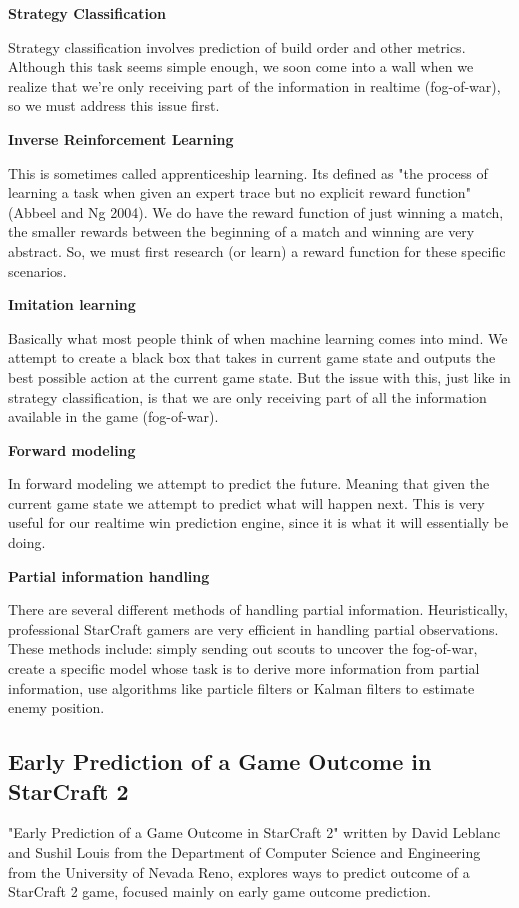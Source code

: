 \documentclass[a4paper,12pt]{report}
\newcommand{\msection}[1]{\noindent\textbf{#1}}
\begin{document}
\msection{Strategy Classification}

Strategy classification involves prediction of build order and other metrics. Although this task seems simple enough, we soon come into a wall when we realize that we're only receiving part of the information in realtime (fog-of-war), so we must address this issue first.

\msection{Inverse Reinforcement Learning}

This is sometimes called apprenticeship learning. Its defined as "the process of learning a task when given an expert trace but no explicit reward function" (Abbeel and Ng 2004). We do have the reward function of just winning a match, the smaller rewards between the beginning of a match and winning are very abstract. So, we must first research (or learn) a reward function for these specific scenarios.

\msection{Imitation learning}

Basically what most people think of when machine learning comes into mind. We attempt to create a black box that takes in current game state and outputs the best possible action at the current game state. But the issue with this, just like in strategy classification, is that we are only receiving part of all the information available in the game (fog-of-war).

\msection{Forward modeling}

In forward modeling we attempt to predict the future. Meaning that given the current game state we attempt to predict what will happen next. This is very useful for our realtime win prediction engine, since it is what it will essentially be doing.

\msection{Partial information handling}

There are several different methods of handling partial information. Heuristically, professional StarCraft gamers are very efficient in handling partial observations. These methods include: simply sending out scouts to uncover the fog-of-war, create a specific model whose task is to derive more information from partial information, use algorithms like particle filters or Kalman filters to estimate enemy position.

\subsection{Early Prediction of a Game Outcome in StarCraft 2}

"Early Prediction of a Game Outcome in StarCraft 2" written by David Leblanc and Sushil Louis from the Department of Computer Science and Engineering from the University of Nevada Reno, explores ways to predict outcome of a StarCraft 2 game, focused mainly on early game outcome prediction.
\end{document}
